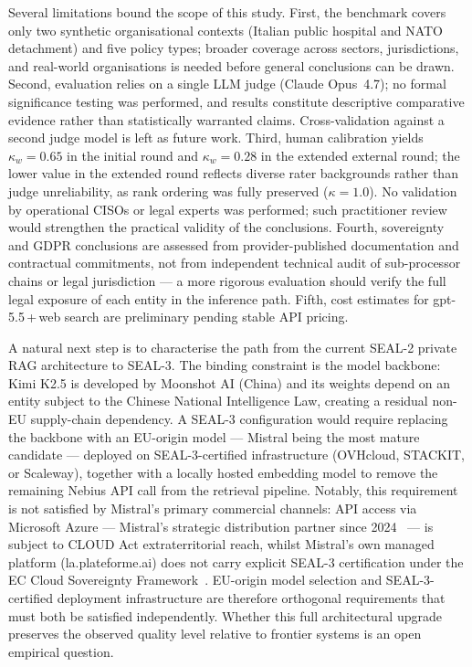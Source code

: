 \documentclass[runningheads]{llncs}
\begin{document}
Several limitations bound the scope of this study.
First, the benchmark covers only two synthetic organisational contexts
(Italian public hospital and NATO detachment) and five policy types;
broader coverage across sectors, jurisdictions, and real-world organisations
is needed before general conclusions can be drawn.
Second, evaluation relies on a single LLM judge (Claude Opus~4.7);
no formal significance testing was performed, and results constitute
descriptive comparative evidence rather than statistically warranted claims.
Cross-validation against a second judge model is left as future work.
Third, human calibration yields $\kappa_w = 0.65$ in the initial round
and $\kappa_w = 0.28$ in the extended external round; the lower value
in the extended round reflects diverse rater backgrounds rather than
judge unreliability, as rank ordering was fully preserved ($\kappa = 1.0$).
No validation by operational CISOs or legal experts was performed; such
practitioner review would strengthen the practical validity of the conclusions.
Fourth, sovereignty and GDPR conclusions are assessed from provider-published
documentation and contractual commitments, not from independent technical audit
of sub-processor chains or legal jurisdiction --- a more rigorous evaluation
should verify the full legal exposure of each entity in the inference path.
Fifth, cost estimates for gpt-5.5\,+\,web search are preliminary pending
stable API pricing.

A natural next step is to characterise the path from the current SEAL-2
private RAG architecture to SEAL-3. The binding constraint is the model
backbone: Kimi K2.5 is developed by Moonshot AI (China) and its weights
depend on an entity subject to the Chinese National Intelligence Law,
creating a residual non-EU supply-chain dependency. A SEAL-3 configuration
would require replacing the backbone with an EU-origin model --- Mistral
being the most mature candidate --- deployed on SEAL-3-certified
infrastructure (OVHcloud, STACKIT, or Scaleway), together with a locally
hosted embedding model to remove the remaining Nebius API call from the
retrieval pipeline. Notably, this requirement is not satisfied by Mistral's primary
commercial channels: API access via Microsoft Azure --- Mistral's
strategic distribution partner since 2024~\cite{azure_mistral2024} ---
is subject to CLOUD Act extraterritorial reach, whilst Mistral's own
managed platform (la.plateforme.ai) does not carry explicit SEAL-3
certification under the EC Cloud Sovereignty Framework~\cite{ecseal2026}.
EU-origin model selection and SEAL-3-certified deployment infrastructure
are therefore orthogonal requirements that must both be satisfied
independently.
Whether this full architectural upgrade preserves the
observed quality level relative to frontier systems is an open empirical
question.
\end{document}
